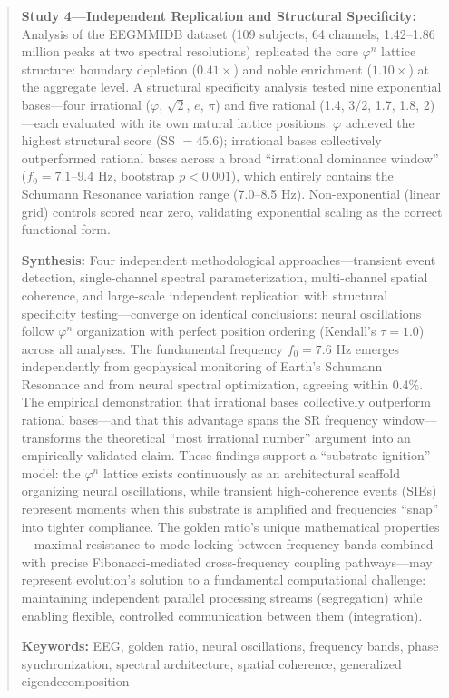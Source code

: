 \documentclass[11pt,a4paper]{article}
\newcommand{\phisym}{\varphi}
\begin{document}
\begin{abstract}
\textbf{Study 4---Independent Replication and Structural Specificity:} Analysis of the EEGMMIDB dataset (109 subjects, 64 channels, 1.42--1.86 million peaks at two spectral resolutions) replicated the core $\phisym^n$ lattice structure: boundary depletion ($0.41\times$) and noble enrichment ($1.10\times$) at the aggregate level. A structural specificity analysis tested nine exponential bases---four irrational ($\phisym$, $\sqrt{2}$, $e$, $\pi$) and five rational (1.4, 3/2, 1.7, 1.8, 2)---each evaluated with its own natural lattice positions. $\phisym$ achieved the highest structural score (SS $= 45.6$); irrational bases collectively outperformed rational bases across a broad ``irrational dominance window'' ($f_0 = 7.1$--$9.4$ Hz, bootstrap $p < 0.001$), which entirely contains the Schumann Resonance variation range (7.0--8.5 Hz). Non-exponential (linear grid) controls scored near zero, validating exponential scaling as the correct functional form.

\textbf{Synthesis:} Four independent methodological approaches---transient event detection, single-channel spectral parameterization, multi-channel spatial coherence, and large-scale independent replication with structural specificity testing---converge on identical conclusions: neural oscillations follow $\phisym^n$ organization with perfect position ordering (Kendall's $\tau = 1.0$) across all analyses. The fundamental frequency $f_0 = 7.6$ Hz emerges independently from geophysical monitoring of Earth's Schumann Resonance and from neural spectral optimization, agreeing within 0.4\%. The empirical demonstration that irrational bases collectively outperform rational bases---and that this advantage spans the SR frequency window---transforms the theoretical ``most irrational number'' argument into an empirically validated claim. These findings support a ``substrate-ignition'' model: the $\phisym^n$ lattice exists continuously as an architectural scaffold organizing neural oscillations, while transient high-coherence events (SIEs) represent moments when this substrate is amplified and frequencies ``snap'' into tighter compliance. The golden ratio's unique mathematical properties---maximal resistance to mode-locking between frequency bands combined with precise Fibonacci-mediated cross-frequency coupling pathways---may represent evolution's solution to a fundamental computational challenge: maintaining independent parallel processing streams (segregation) while enabling flexible, controlled communication between them (integration).

\vspace{0.3cm}
\textbf{Keywords:} EEG, golden ratio, neural oscillations, frequency bands, phase synchronization, spectral architecture, spatial coherence, generalized eigendecomposition
\end{abstract}
\end{document}
